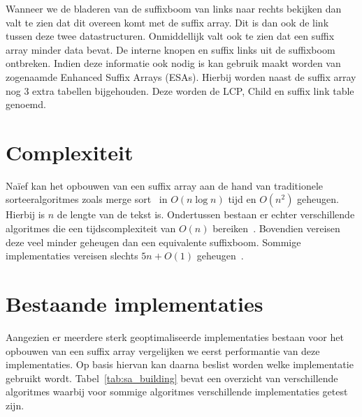 Wanneer we de bladeren van de suffixboom van links naar rechts bekijken dan valt te zien dat dit overeen komt met de suffix array.
Dit is dan ook de link tussen deze twee datastructuren.
Onmiddellijk valt ook te zien dat een suffix array minder data bevat.
De interne knopen en suffix links uit de suffixboom ontbreken.
Indien deze informatie ook nodig is kan gebruik maakt worden van zogenaamde Enhanced Suffix Arrays (ESAs).
Hierbij worden naast de suffix array nog 3 extra tabellen bijgehouden.
Deze worden de LCP, Child en suffix link table genoemd.


\section{Complexiteit}\label{sec:complexiteit}
Naïef kan het opbouwen van een suffix array aan de hand van traditionele sorteeralgoritmes zoals merge sort~\cite{mergeSort} in $O(n \log n)$ tijd en $O(n^2)$ geheugen.
Hierbij is $n$ de lengte van de tekst is.
Ondertussen bestaan er echter verschillende algoritmes die een tijdscomplexiteit van $O(n)$ bereiken~\cite{sais, ko_alura, radixSA, dark_archon, libdivsufsort}.
Bovendien vereisen deze veel minder geheugen dan een equivalente suffixboom.
Sommige implementaties vereisen slechts $5n + O(1)$ geheugen~\cite{dark_archon, libdivsufsort}.


\section{Bestaande implementaties}\label{sec:bestaande-implementaties}
Aangezien er meerdere sterk geoptimaliseerde implementaties bestaan voor het opbouwen van een suffix array vergelijken we eerst performantie van deze implementaties.
Op basis hiervan kan daarna beslist worden welke implementatie gebruikt wordt.
Tabel~\ref{tab:sa_building} bevat een overzicht van verschillende algoritmes waarbij voor sommige algoritmes verschillende implementaties getest zijn.

